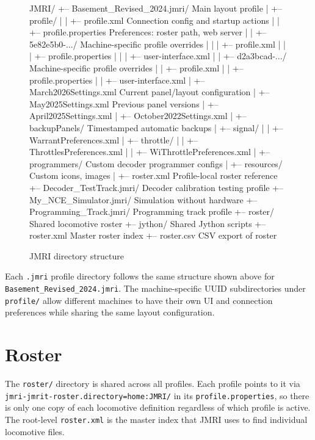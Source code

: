 \begin{figure}[htbp]
\begin{filetree}
JMRI/
+-- Basement_Revised_2024.jmri/     Main layout profile
|   +-- profile/
|   |   +-- profile.xml             Connection config and startup actions
|   |   +-- profile.properties      Preferences: roster path, web server
|   |   +-- 5e82e5b0-.../           Machine-specific profile overrides
|   |   |   +-- profile.xml
|   |   |   +-- profile.properties
|   |   |   +-- user-interface.xml
|   |   +-- d2a3bcad-.../           Machine-specific profile overrides
|   |       +-- profile.xml
|   |       +-- profile.properties
|   |       +-- user-interface.xml
|   +-- March2026Settings.xml       Current panel/layout configuration
|   +-- May2025Settings.xml         Previous panel versions
|   +-- April2025Settings.xml
|   +-- October2022Settings.xml
|   +-- backupPanels/               Timestamped automatic backups
|   +-- signal/
|   |   +-- WarrantPreferences.xml
|   +-- throttle/
|   |   +-- ThrottlesPreferences.xml
|   |   +-- WiThrottlePreferences.xml
|   +-- programmers/                Custom decoder programmer configs
|   +-- resources/                  Custom icons, images
|   +-- roster.xml                  Profile-local roster reference
+-- Decoder_TestTrack.jmri/         Decoder calibration testing profile
+-- My_NCE_Simulator.jmri/         Simulation without hardware
+-- Programming_Track.jmri/         Programming track profile
+-- roster/                         Shared locomotive roster
+-- jython/                         Shared Jython scripts
+-- roster.xml                      Master roster index
+-- roster.csv                      CSV export of roster
\end{filetree}
\caption{JMRI directory structure}
\label{fig:jmri-file-structure}
\end{figure}

Each \texttt{.jmri} profile directory follows the same structure shown above for \texttt{Basement\_Revised\_2024.jmri}.  The machine-specific UUID subdirectories under \texttt{profile/} allow different machines to have their own UI and connection preferences while sharing the same layout configuration.

\section{Roster}
The \texttt{roster/} directory is shared across all profiles.  Each profile points to it via \texttt{jmri-jmrit-roster.directory=home:JMRI/} in its \texttt{profile.properties}, so there is only one copy of each locomotive definition regardless of which profile is active.  The root-level \texttt{roster.xml} is the master index that JMRI uses to find individual locomotive files.

